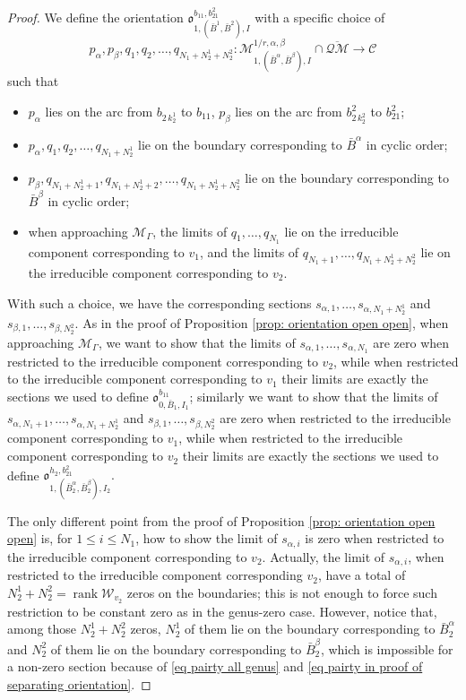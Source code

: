 \documentclass[11pt,a4paper]{article}
\theoremstyle{definition}
\theoremstyle{remark}
\newcommand{\oQMb}{{\overline{\mathcal{QM}}}}
\numberwithin{equation}{section}
\begin{document}
\begin{proof}
    We define the orientation ${\mathfrak{o}}^{b_{11},b_{21}^2}_{1,(\bar{B}^1,\bar{B}^2),I}$ with a specific choice of $$p_\alpha,p_\beta,q_1,q_2,\dots,q_{N_1+N_2^1+N_2^2}\colon \mathcal M^{1/r,\alpha,\beta}_{1,(\bar{B}^\alpha,\bar{B}^\beta),I}\cap \oQMb\to \mathcal C$$ such that 
    \begin{itemize}
        \item $p_\alpha$ lies on the arc from $b_{2\,k_2^1}$ to $b_{11}$, $p_\beta$ lies on the arc from $b_{2\,k_2^2}^2$ to $b_{21}^2$;
        \item $p_\alpha,q_1,q_2,\dots,q_{N_1+N_2^1}$ lie on the boundary corresponding to $\bar{B}^\alpha$ in cyclic order;
        \item $p_\beta,q_{N_1+N_2^1+1},q_{N_1+N_2^1+2},\dots,q_{N_1+N_2^1+N_2^2}$ lie on the boundary corresponding to $\bar{B}^\beta$ in cyclic order;
        \item when approaching $\mathcal M_\Gamma$, the limits of $q_1,\dots,q_{N_1}$ lie on the irreducible component corresponding to $v_1$, and  the limits of $q_{N_1+1},\dots,q_{N_1+N_2^1+N_2^2}$ lie on the irreducible component corresponding to $v_2$.
    \end{itemize}  
    With such a choice, we have the corresponding sections $s_{\alpha,1},\dots,s_{\alpha,N_1+N_2^1}$ and $s_{\beta,1},\dots,s_{\beta,N_2^2}$. As in the proof of Proposition \ref{prop: orientation open open}, when approaching $\mathcal M_\Gamma$,  we want to show that the limits of $s_{\alpha,1},\dots,s_{\alpha,N_1}$ are zero when restricted to the irreducible component corresponding to $v_2$, while when restricted to the irreducible component corresponding to $v_1$ their limits are exactly the sections we used to define ${\mathfrak{o}}^{b_{11}}_{0,\bar B_1,I_1}$; similarly we want to show that the limits of $s_{\alpha,N_1+1},\dots, s_{\alpha,N_1+N_2^1}$ and $s_{\beta,1},\dots,s_{\beta,N_2^2}$  are zero when restricted to the irreducible component corresponding to $v_1$, while when restricted to the irreducible component corresponding to $v_2$ their limits are exactly the sections we used to define
    ${\mathfrak{o}}^{h_2, b_{21}^2}_{1,(\bar{B}_2^\alpha,\bar{B}_2^\beta),I_2}.$ 

    The only different point from the proof of Proposition \ref{prop: orientation open open} is, for $1\le i \le N_1$, how to show the limit of $s_{\alpha,i}$ is zero when restricted to the irreducible component corresponding to $v_2$. Actually, the limit of $s_{\alpha,i}$,  when restricted to the irreducible component corresponding $v_2$, have a total of $N_2^1+N_2^2=\operatorname{rank} \mathcal W_{v_2}$ zeros on the boundaries; this is not enough to force such restriction to be constant zero as in the genus-zero case. However, notice that, among those $N_2^1+N_2^2$ zeros, $N_2^1$ of them lie on the boundary corresponding to $\bar{B}_2^\alpha$ and $N_2^2$ of them lie on the boundary corresponding to $\bar{B}_2^\beta$, which is impossible for a non-zero section because of \eqref{eq pairty all genus} and \eqref{eq pairty in proof of separating orientation}.


\end{proof}
\end{document}
